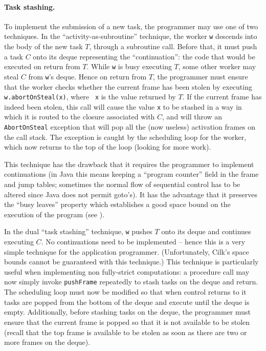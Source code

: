 \paragraph{Task stashing.}
To implement the submission of a new task, the programmer may use one
of two techniques. In the ``activity-as-subroutine'' technique, the
worker {\tt w} descends into the body of the new task $T$, through a
subroutine call. Before that, it must push a task $C$ onto its deque
representing the ``continuation'': the code that would be executed on
return from $T$. While {\tt w} is busy executing $T$, some other
worker may steal $C$ from {\tt w}'s deque. Hence on return from $T$,
the programmer must ensure that the worker checks whether the current
frame has been stolen by executing {\tt w.abortOnSteal(x)}, where {\tt
x} is the value returned by $T$. If the current frame has indeed been
stolen, this call will cause the value {\tt x} to be stashed in a way
in which it is routed to the closure associated with $C$, and will
throw an {\tt AbortOnSteal} exception that will pop all the (now
useless) activation frames on the call stack.  The exception is caught
by the scheduling loop for the worker, which now returns to the top of
the loop (looking for more work).

This technique has the drawback that it requires the programmer to
implement continuations (in Java this means keeping a ``program
counter'' field in the frame and jump tables; sometimes the normal
flow of sequential control has to be altered since Java does not
permit goto's). It has the advantage that it preserves the ``busy
leaves'' property which establishes a good space bound on the
execution of the program (see \cite{BJKLRZ95,frigo98implementation}).

In the dual ``task stashing'' technique, {\tt w} pushes $T$ onto its
deque and continues executing $C$. No continuations need to be
implemented -- hence this is a very simple technique for the
application programmer. (Unfortunately, Cilk's space bounds cannot be
guaranteed with this technique.) This technique is particularly useful
when implementing non fully-strict computations: a procedure call may
now simply invoke {\tt pushFrame} repeatedly to stash tasks on the
deque and return. The scheduling loop must now be modified so that
when control returns to it tasks are popped from the bottom of the
deque and execute until the deque is empty.  Additionally, before
stashing tasks on the deque, the programmer must ensure that the
current frame is popped so that it is not available to be stolen
(recall that the top frame is available to be stolen as soon as there
are two or more frames on the deque).  


